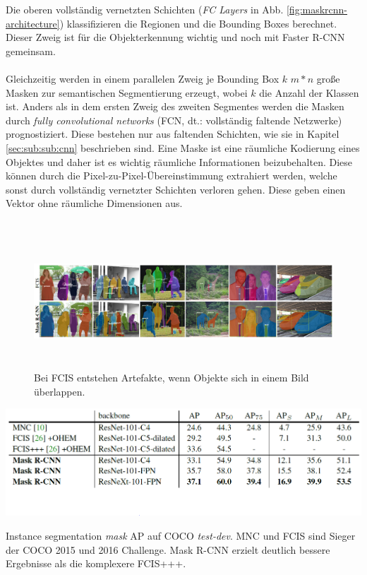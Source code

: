 \noindent
Die oberen vollständig vernetzten Schichten (\textit{FC Layers} in Abb. \ref{fig:maskrcnn-architecture}) klassifizieren die Regionen und die Bounding Boxes berechnet. Dieser Zweig ist für die Objekterkennung wichtig und noch mit Faster R-CNN gemeinsam. 
\\\\
Gleichzeitig werden in einem parallelen Zweig je Bounding Box $k$ $m*n$ große Masken zur semantischen Segmentierung erzeugt, wobei $k$ die Anzahl der Klassen ist.  Anders als in dem ersten Zweig des zweiten Segmentes werden die Masken durch \textit{fully convolutional networks} (FCN, dt.: vollständig faltende Netzwerke) prognostiziert. Diese bestehen nur aus faltenden Schichten, wie sie in Kapitel \ref{sec:sub:sub:cnn} beschrieben sind. Eine Maske ist eine räumliche Kodierung eines Objektes und daher ist es wichtig räumliche Informationen beizubehalten. Diese können durch die Pixel-zu-Pixel-Übereinstimmung extrahiert werden, welche sonst durch vollständig vernetzter Schichten verloren gehen. Diese geben einen Vektor ohne räumliche Dimensionen aus.\cite{ref:maskrcnn} 
\\\\
\begin{figure}[ht]
  \centering
  \includegraphics[width=\textwidth, height=5cm]{pics/mrcnn-vs-fcis.PNG}
  \caption[Mask R-CNN vs. FCIS]{Bei FCIS entstehen Artefakte, wenn Objekte sich in einem Bild überlappen.\cite{ref:maskrcnn}}
  \label{fig:maskvsfcis}
\end{figure}
\begin{table}[ht]
  \centering
  \includegraphics[width=\textwidth]{pics/mrcnn-vs-fcis-vs-mnc.PNG}
  \caption[Mask R-CNN im Vergleich]{Instance segmentation \textit{mask} AP auf COCO \textit{test-dev}. MNC und FCIS sind Sieger der COCO 2015 und 2016 Challenge. Mask R-CNN erzielt deutlich bessere Ergebnisse als die komplexere FCIS+++.\cite{ref:maskrcnn}}
  \label{tab:maskvsfcisvsmnc}
\end{table}
